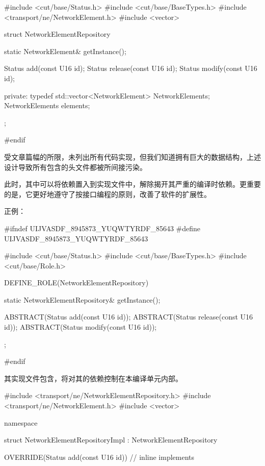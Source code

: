 \begin{content}
\begin{leftbar}
\begin{c++}[caption={\ttfamily{ne/NetworkElementRepository.h}}]
#include <cut/base/Status.h>
#include <cut/base/BaseTypes.h>
#include <transport/ne/NetworkElement.h>
#include <vector>

struct NetworkElementRepository
{
    static NetworkElement& getInstance();

    Status add(const U16 id);
    Status release(const U16 id);
    Status modify(const U16 id);
    
private:
    typedef std::vector<NetworkElement> NetworkElements;
    NetworkElements elements;
};

#endif
\end{c++}
\end{leftbar}

受文章篇幅的所限，未列出所有代码实现，但我们知道拥有巨大的数据结构，上述设计导致所有包含的头文件都被所间接污染。

此时，其中可以将依赖置入到实现文件中，解除揭开其严重的编译时依赖。更重要的是，它更好地遵守了按接口编程的原则，改善了软件的扩展性。

正例：
\begin{leftbar}
\begin{c++}[caption={\ttfamily{ne/NetworkElementRepository.h}}]
#ifndef UIJVASDF_8945873_YUQWTYRDF_85643
#define UIJVASDF_8945873_YUQWTYRDF_85643    

#include <cut/base/Status.h>
#include <cut/base/BaseTypes.h>
#include <cut/base/Role.h>

DEFINE_ROLE(NetworkElementRepository)
{
    static NetworkElementRepository& getInstance();

    ABSTRACT(Status add(const U16 id));
    ABSTRACT(Status release(const U16 id));
    ABSTRACT(Status modify(const U16 id));
};

#endif
\end{c++}
\end{leftbar}

其实现文件包含，将对其的依赖控制在本编译单元内部。

\begin{leftbar}
\begin{c++}[caption={\ttfamily{ne/NetworkElementRepository.cpp}}]

#include <transport/ne/NetworkElementRepository.h>
#include <transport/ne/NetworkElement.h>
#include <vector>

namespace
{
    struct NetworkElementRepositoryImpl : NetworkElementRepository
    {
        OVERRIDE(Status add(const U16 id))
        {
            // inline implements
        }

}}
\end{c++}
\end{leftbar}
\end{content}

